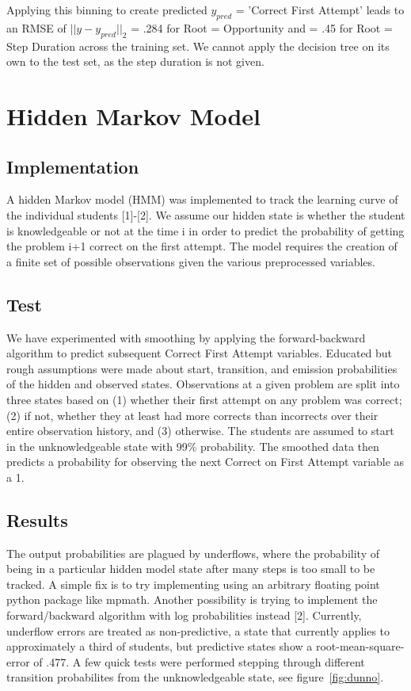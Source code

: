 \documentclass{article} %
\begin{document}
Applying this binning to create predicted $y_{pred}$ = 'Correct First Attempt' leads to an RMSE of $||y - y_{pred}||_2$ = .284 for Root = Opportunity and = .45 for Root = Step Duration across the training set. We cannot apply the decision tree on its own to the test set, as the step duration is not given.

\section{Hidden Markov Model}
\subsection{Implementation}
A hidden Markov model (HMM) was implemented to track the learning curve of the individual students [1]-[2]. We assume our hidden state is whether the student is knowledgeable or not at the time i in order to predict the probability of getting the problem i+1 correct on the first attempt. The model requires the creation of a finite set of possible observations given the various preprocessed variables. 

\subsection{Test}
We have experimented with smoothing by applying the forward-backward algorithm to predict subsequent Correct First Attempt variables. Educated but rough assumptions were made about start, transition, and emission probabilities of the hidden and observed states. Observations at a given problem are split into three states based on (1) whether their first attempt on any problem was correct; (2) if not, whether they at least had more corrects than incorrects over their entire observation history, and (3) otherwise. The students are assumed to start in the unknowledgeable state with 99\% probability. The smoothed data then predicts a probability for observing the next Correct on First Attempt variable as a 1.

\subsection{Results}
The output probabilities are plagued by underflows, where the probability of being in a particular hidden model state after many steps is too small to be tracked. A simple fix is to try implementing using an arbitrary floating point python package like mpmath. Another possibility is trying to implement the forward/backward algorithm with log probabilities instead [2]. Currently, underflow errors are treated as non-predictive, a state that currently applies to approximately a third of students, but predictive states show a root-mean-square-error of .477. A few quick tests were performed stepping through different transition probabilites from the unknowledgeable state, see figure~\ref{fig:dunno}.
\end{document}
